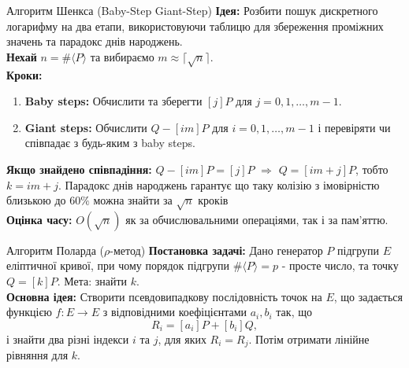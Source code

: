 \documentclass[9pt]{beamer}
\begin{document}
\begin{darkframes}
\begin{frame}{Алгоритм Шенкса (Baby-Step Giant-Step)}
  \textbf{Ідея:} Розбити пошук дискретного логарифму на два етапи, використовуючи таблицю для збереження проміжних значень та парадокс днів народжень.\\[2mm]
  \textbf{Нехай} \(n = \#\langle P\rangle\) та вибираємо \(m \approx \lceil \sqrt{n} \rceil\).\\[1mm]
  \textbf{Кроки:}
  \begin{enumerate}
    \item \textbf{Baby steps:} Обчислити та зберегти \( [j]P \) для \( j=0,1,\dots, m-1 \).
    \item \textbf{Giant steps:} Обчислити \( Q - [im]P \) для \( i=0,1,\dots, m-1 \) і перевіряти чи співпадає з будь-яким з baby steps.
  \end{enumerate}
  \vspace{0.3cm}
  \textbf{Якщо знайдено співпадіння:} \( Q - [im]P = [j]P \) \(\Rightarrow\) \( Q = [im+j]P \), тобто \( k = im+j \). Парадокс днів народжень гарантує що таку колізію з імовірністю близькою до $60\%$ можна знайти за $\sqrt{n}$ кроків \\
  \textbf{Оцінка часу:} \(O(\sqrt{n})\) як за обчислювальними операціями, так і за пам’яттю.
\end{frame}

\begin{frame}{Алгоритм Поларда ($\rho$-метод)}
  \textbf{Постановка задачі:}  
  Дано генератор \(P\) підгрупи \(E\) еліптичної кривої, при чому порядок підгрупи $\#\langle P\rangle=p$ - просте число, та точку \(Q = [k]P\).  
  Мета: знайти \(k\).\\[2mm]
  \textbf{Основна ідея:}  
  Створити псевдовипадкову послідовність точок на \(E\), що задається функцією \(f: E \to E\) з відповідними коефіцієнтами \(a_i, b_i\) так, що 
  \[
  R_i = [a_i]P + [b_i]Q,
  \]
  і знайти два різні індекси \(i\) та \(j\), для яких \(R_i = R_j\). Потім отримати лінійне рівняння для \(k\).
\end{frame}


\end{darkframes}
\end{document}
